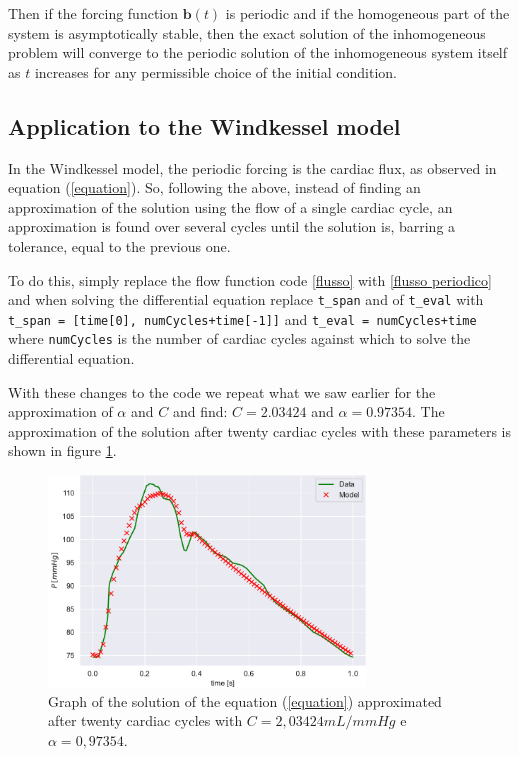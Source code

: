 Then if the forcing function $\bm{b}(t)$ is periodic and if the homogeneous part of the system is asymptotically stable, then the exact solution of the inhomogeneous problem will converge to the periodic solution of the inhomogeneous system itself as $t$ increases for any permissible choice of the initial condition.

\subsection{Application to the Windkessel model}
In the Windkessel model, the periodic forcing is the cardiac flux, as observed in equation (\ref{equation}). So, following the above, instead of finding an approximation of the solution using the flow of a single cardiac cycle, an approximation is found over several cycles until the solution is, barring a tolerance, equal to the previous one.

To do this, simply replace the flow function code \ref{flusso} with \ref{flusso periodico} and when solving the differential equation replace \verb|t_span| and of \verb|t_eval| with \verb|t_span = [time[0], numCycles+time[-1]]| and \verb|t_eval = numCycles+time| where \verb|numCycles| is the number of cardiac cycles against which to solve the differential equation. 

\newpage

With these changes to the code we repeat what we saw earlier for the approximation of $\alpha$ and $C$ and find: $C=2.03424$ and $\alpha= 0.97354$. The approximation of the solution after twenty cardiac cycles with these parameters is shown in figure \ref{soluzionePeriodicaCalphaapprossimata}.


\begin{figure}[h]
    \centering
    \includegraphics[width=0.75\textwidth]{images/Windkessel/modelloPeriodicoCalphastimata.pdf}
    \caption{Graph of the solution of the equation (\ref{equation}) approximated after twenty cardiac cycles with $C=2,03424mL/mmHg$ e $\alpha=0,97354$.}
    \label{soluzionePeriodicaCalphaapprossimata}
\end{figure}

